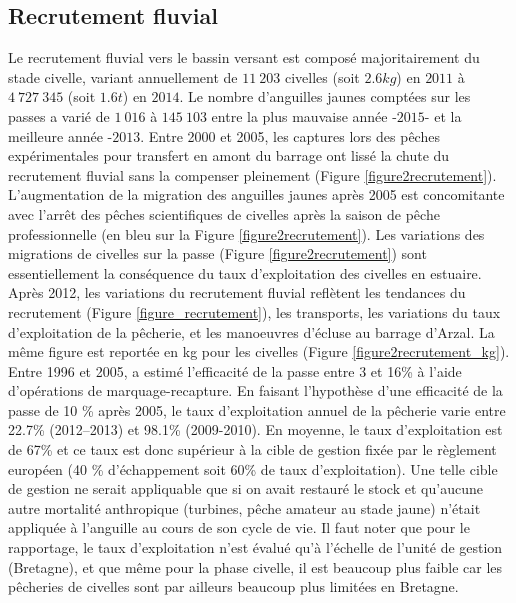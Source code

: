 \documentclass[10pt,twocolumn,titlepage,twoside]{article}\usepackage[]{graphicx}\usepackage[]{xcolor}
\begin{document}
\subsection{Recrutement fluvial}




Le recrutement fluvial vers le bassin versant
est composé majoritairement du stade civelle, variant annuellement de
$11~203$ civelles  (soit $2.6 kg$) en $2011$ à
$4~727~345$ (soit $1.6t$) en $2014$. 
Le nombre d'anguilles jaunes comptées sur les passes a varié de $1~016$
à $145~103$ entre la plus mauvaise année -$2015$- et la
meilleure année -$2013$.
Entre 2000 et 2005, les captures lors des pêches expérimentales pour
transfert en amont du barrage ont lissé la chute du recrutement fluvial sans la
compenser pleinement (Figure \ref{figure2recrutement}). L'augmentation de la
migration des anguilles jaunes après 2005 est concomitante avec
l'arrêt des pêches scientifiques de civelles
après la saison de pêche professionnelle (en bleu sur la Figure
\ref{figure2recrutement}). Les variations des migrations de civelles sur la
passe (Figure \ref{figure2recrutement}) sont essentiellement la conséquence du taux
d'exploitation des civelles en estuaire.
Après 2012, les variations du recrutement fluvial reflètent les tendances du
recrutement (Figure \ref{figure_recrutement}), les transports, les variations
du taux d'exploitation de la pêcherie, et les manoeuvres d'écluse au barrage
d'Arzal. La même figure est reportée en kg
pour les civelles (Figure \ref{figure2recrutement_kg}).
Entre 1996 et 2005, \citet{briand_dynamique_2009} a estimé l'efficacité de la
passe entre 3 et 16\% à l'aide d'opérations de marquage-recapture. En faisant
l'hypothèse d'une efficacité de la passe de 10 \% après 2005, le taux
d'exploitation annuel de la pêcherie varie entre 22.7\% (2012--2013) et 98.1\%
(2009-2010). En moyenne, le taux d'exploitation est de 67\% et ce taux
est donc supérieur à la cible de gestion fixée par le règlement européen (40 \% d'échappement soit
60\% de taux d'exploitation). Une telle cible de gestion ne serait appliquable
que si on avait restauré le stock et qu'aucune autre mortalité anthropique
(turbines, pêche amateur au stade jaune) n'était appliquée à l'anguille au
cours de son cycle de vie.
Il faut noter que pour le rapportage, le taux d'exploitation n'est évalué qu'à l'échelle 
de l'unité de gestion (Bretagne), et que même pour la phase civelle, il est
beaucoup plus faible car les pêcheries de civelles sont par ailleurs beaucoup
plus limitées en Bretagne.
\end{document}
